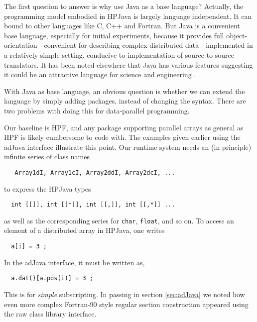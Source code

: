 The first question to answer is why use Java as a base language?
Actually, the programming model embodied in HPJava is largely language
independent.  It can bound to other languages like C, C++ and Fortran.
But Java is a convenient base language, especially for initial
experiments, because it provides full object-orientation---convenient
for describing complex distributed data---implemented in a relatively
simple setting, conducive to implementation of source-to-source
translators.  It has been noted elsewhere that Java has various
features suggesting it could be an attractive language for science
and engineering \cite{Java98}.

With Java as base language, an obvious question is whether we can
extend the language by simply adding packages, instead of changing the
syntax.  There are two problems with doing this for data-parallel
programming.

Our baseline is HPF, and any package supporting parallel arrays as
general as HPF is likely cumbersome to code with.  The examples given
earlier using the adJava interface illustrate this point.  Our runtime
system needs an (in principle) infinite series of class names
\begin{small}
\begin{verbatim}
   Array1dI, Array1cI, Array2ddI, Array2dcI, ...
\end{verbatim}
\end{small}
to express the HPJava types
\begin{small}
\begin{verbatim}
  int [[]], int [[*]], int [[,]], int [[,*]] ... 
\end{verbatim}
\end{small}
as well as the corresponding series for \texttt{char}, \texttt{float}, and so on.
To access an element of a distributed array in HPJava, one writes
\begin{small}
\begin{verbatim}
  a[i] = 3 ;
\end{verbatim}
\end{small}
In the adJava interface, it must be written as,
\begin{small}
\begin{verbatim}
  a.dat()[a.pos(i)] = 3 ;
\end{verbatim}
\end{small}
This is for {\em simple} subscripting.  In passing in section
\ref{sec:adJava} we noted how even more complex Fortran-90 style
regular section construction appeared using the raw class library
interface.

